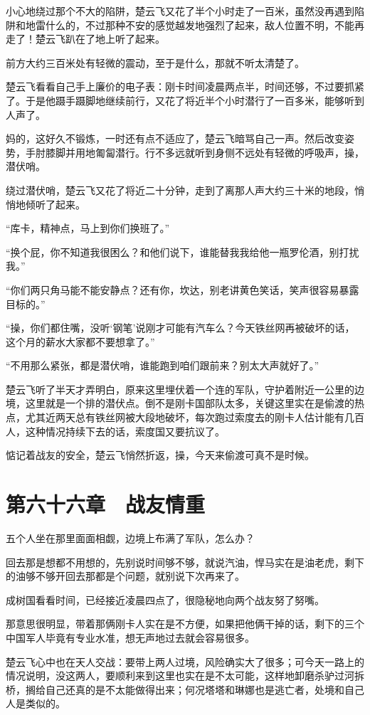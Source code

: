 小心地绕过那个不大的陷阱，楚云飞又花了半个小时走了一百米，虽然没再遇到陷阱和地雷什么的，不过那种不安的感觉越发地强烈了起来，敌人位置不明，不能再走了！楚云飞趴在了地上听了起来。

前方大约三百米处有轻微的震动，至于是什么，那就不听太清楚了。

楚云飞看看自己手上廉价的电子表：刚卡时间凌晨两点半，时间还够，不过要抓紧了。于是他蹑手蹑脚地继续前行，又花了将近半个小时潜行了一百多米，能够听到人声了。

妈的，这好久不锻炼，一时还有点不适应了，楚云飞暗骂自己一声。然后改变姿势，手肘膝脚并用地匍匐潜行。行不多远就听到身侧不远处有轻微的呼吸声，操，潜伏哨。

绕过潜伏哨，楚云飞又花了将近二十分钟，走到了离那人声大约三十米的地段，悄悄地倾听了起来。

“库卡，精神点，马上到你们换班了。”

“换个屁，你不知道我很困么？和他们说下，谁能替我我给他一瓶罗伦酒，别打扰我。”

“你们两只角马能不能安静点？还有你，坎达，别老讲黄色笑话，笑声很容易暴露目标的。”

“操，你们都住嘴，没听‘钢笔’说刚才可能有汽车么？今天铁丝网再被破坏的话，这个月的薪水大家都不要想拿了。”

“不用那么紧张，都是潜伏哨，谁能跑到咱们跟前来？别太大声就好了。”

楚云飞听了半天才弄明白，原来这里埋伏着一个连的军队，守护着附近一公里的边境，这里就是一个排的潜伏点。倒不是刚卡国部队太多，关键这里实在是偷渡的热点，尤其近两天总有铁丝网被大段地破坏，每次跑过索度去的刚卡人估计能有几百人，这种情况持续下去的话，索度国又要抗议了。

惦记着战友的安全，楚云飞悄然折返，操，今天来偷渡可真不是时候。

\section{第六十六章　战友情重}

五个人坐在那里面面相觑，边境上布满了军队，怎么办？

回去那是想都不用想的，先别说时间够不够，就说汽油，悍马实在是油老虎，剩下的油够不够开回去那都是个问题，就别说下次再来了。

成树国看看时间，已经接近凌晨四点了，很隐秘地向两个战友努了努嘴。

那意思很明显，带着那俩刚卡人实在是不方便，如果把他俩干掉的话，剩下的三个中国军人毕竟有专业水准，想无声地过去就会容易很多。

楚云飞心中也在天人交战：要带上两人过境，风险确实大了很多；可今天一路上的情况说明，没这两人，要顺利来到这里也实在是不太可能，这样地卸磨杀驴过河拆桥，搁给自己还真的是不太能做得出来；何况塔塔和琳娜也是逃亡者，处境和自己人是类似的。


